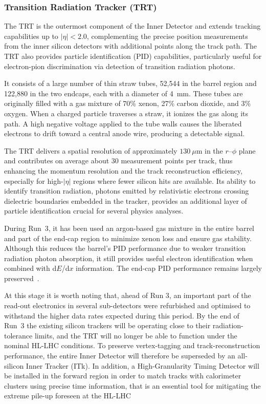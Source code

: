 \subsubsection*{Transition Radiation Tracker (TRT)}

The TRT is the outermost component of the Inner Detector and extends tracking capabilities up to $|\eta| < 2.0$, complementing the precise position measurements from the inner silicon detectors with additional points along the track path. The TRT also provides particle identification (PID) capabilities, particularly useful for electron-pion discrimination via detection of transition radiation photons.

It consists of a large number of thin straw tubes, 52,544 in the barrel region and 122,880 in the two endcaps, each with a diameter of 4~mm. These tubes are originally filled with a gas mixture of 70\% xenon, 27\% carbon dioxide, and 3\% oxygen. When a charged particle traverses a straw, it ionizes the gas along its path. A high negative voltage applied to the tube walls causes the liberated electrons to drift toward a central anode wire, producing a detectable signal. 

The TRT delivers a spatial resolution of approximately $130~\mu\text{m}$ in the $r\text{--}\phi$ plane and contributes on average about 30 measurement points per track, thus enhancing the momentum resolution and the track reconstruction efficiency, especially for high-$|\eta|$ regions where fewer silicon hits are available. Its ability to identify transition radiation, photons emitted by relativistic electrons crossing dielectric boundaries embedded in the tracker, provides an additional layer of particle identification crucial for several physics analyses.

During Run~3, it has been used an argon-based gas mixture in the entire barrel and part of the end-cap region to minimize xenon loss and ensure gas stability. Although this reduces the barrel's PID performance due to weaker transition radiation photon absorption, it still provides useful electron identification when combined with d$E$/d$x$ information. The end-cap PID performance remains largely preserved~\cite{ATLAS_run3}.

\vspace{-0.3}
At this stage it is worth noting that, ahead of Run 3, an important part of the read-out electronics in several sub-detectors were refurbished and optimised to withstand the higher data rates expected during this period. By the end of Run~3 the existing silicon trackers will be operating close to their radiation-tolerance limits, and the TRT will no longer be able to function under the nominal HL-LHC conditions. To preserve vertex-tagging and track-reconstruction performance, the entire Inner Detector will therefore be superseded by an all-silicon Inner Tracker (ITk). In addition, a High-Granularity Timing Detector will be installed in the forward region in order to match tracks with calorimeter clusters using precise time information, that is an essential tool for mitigating the extreme pile-up foreseen at the HL-LHC \cite{ATLAS:1502664}

